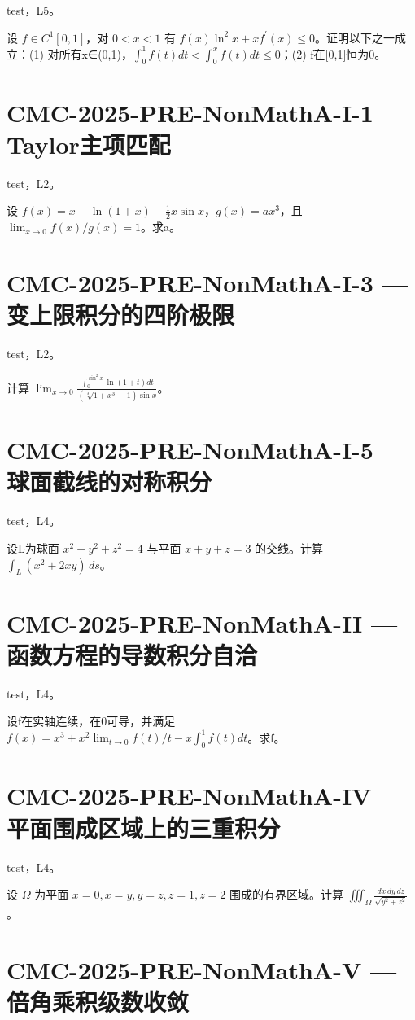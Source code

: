 \documentclass[UTF8]{ctexart}
\begin{document}
test，L5。

设 $f\in C^1[0,1]$，对 $0<x<1$ 有 $f(x)\ln^2x+xf^{\prime}(x)\le0$。证明以下之一成立：(1) 对所有x∈(0,1)，$\int_0^1f(t)dt<\int_0^xf(t)dt\le0$；(2) f在[0,1]恒为0。

\section*{CMC-2025-PRE-NonMathA-I-1 — Taylor主项匹配}

test，L2。

设 $f(x)=x-\ln(1+x)-\tfrac12x\sin x$，$g(x)=ax^3$，且 $\lim_{x\to0}f(x)/g(x)=1$。求a。

\section*{CMC-2025-PRE-NonMathA-I-3 — 变上限积分的四阶极限}

test，L2。

计算 $\displaystyle\lim_{x\to0}\frac{\int_0^{\sin^2x}\ln(1+t)dt}{(\sqrt[3]{1+x^3}-1)\sin x}$。

\section*{CMC-2025-PRE-NonMathA-I-5 — 球面截线的对称积分}

test，L4。

设L为球面 $x^2+y^2+z^2=4$ 与平面 $x+y+z=3$ 的交线。计算 $\displaystyle\int_L(x^2+2xy)\,ds$。

\section*{CMC-2025-PRE-NonMathA-II — 函数方程的导数积分自洽}

test，L4。

设f在实轴连续，在0可导，并满足 $f(x)=x^3+x^2\lim_{t\to0}f(t)/t-x\int_0^1f(t)dt$。求f。

\section*{CMC-2025-PRE-NonMathA-IV — 平面围成区域上的三重积分}

test，L4。

设 $\Omega$ 为平面 $x=0,x=y,y=z,z=1,z=2$ 围成的有界区域。计算 $\displaystyle\iiint_\Omega\frac{dx\,dy\,dz}{\sqrt{y^2+z^2}}$。

\section*{CMC-2025-PRE-NonMathA-V — 倍角乘积级数收敛}
\end{document}
